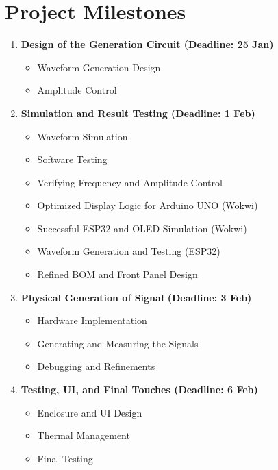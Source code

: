 \documentclass[12pt,a4paper]{article}
\begin{document}
\clearpage


\section{Project Milestones}

\begin{enumerate}
    \item \textbf{Design of the Generation Circuit (Deadline: 25 Jan)}  
    \begin{itemize}
        \item {Waveform Generation Design}
        \item{Amplitude Control}
  \end{itemize}


    
    \item \textbf{Simulation and Result Testing (Deadline: 1 Feb)}  
    \begin{itemize}
        \item {Waveform Simulation}
        \item{Software Testing}
        \item{Verifying Frequency and Amplitude Control}
        \item{Optimized Display Logic for Arduino UNO (Wokwi)}
        \item{Successful ESP32 and OLED Simulation (Wokwi)}
        \item{Waveform Generation and Testing (ESP32)}
        \item{Refined \gls{BOM} and Front Panel Design}
    \end{itemize}

    

\item \textbf{Physical Generation of Signal (Deadline: 3 Feb)}  
    \begin{itemize}
    \item{Hardware Implementation}
    \item{Generating and Measuring the Signals}
    \item{Debugging and Refinements}
   \end{itemize}
    
    \item \textbf{Testing, UI, and Final Touches (Deadline: 6 Feb)}  
    \begin{itemize}
        \item {Enclosure and UI Design}
       \item{Thermal Management}
\item{Final Testing}

   \end{itemize}


\end{enumerate}
\end{document}
